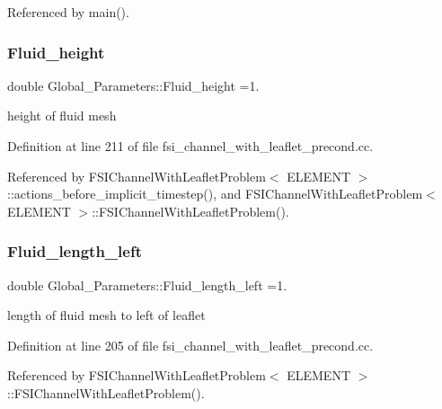 Referenced by main().

\mbox{\label{namespaceGlobal__Parameters_ae1aaf6e9438d5ff7715fe6ceaeaf4fbc}} 
\subsubsection{\texorpdfstring{Fluid\+\_\+height}{Fluid\_height}}
{\footnotesize\ttfamily double Global\+\_\+\+Parameters\+::\+Fluid\+\_\+height =1.}



height of fluid mesh 



Definition at line 211 of file fsi\+\_\+channel\+\_\+with\+\_\+leaflet\+\_\+precond.\+cc.



Referenced by F\+S\+I\+Channel\+With\+Leaflet\+Problem$<$ E\+L\+E\+M\+E\+N\+T $>$\+::actions\+\_\+before\+\_\+implicit\+\_\+timestep(), and F\+S\+I\+Channel\+With\+Leaflet\+Problem$<$ E\+L\+E\+M\+E\+N\+T $>$\+::\+F\+S\+I\+Channel\+With\+Leaflet\+Problem().

\mbox{\label{namespaceGlobal__Parameters_aced7b712f2e8390ceef273157690001b}} 
\subsubsection{\texorpdfstring{Fluid\+\_\+length\+\_\+left}{Fluid\_length\_left}}
{\footnotesize\ttfamily double Global\+\_\+\+Parameters\+::\+Fluid\+\_\+length\+\_\+left =1.}



length of fluid mesh to left of leaflet 



Definition at line 205 of file fsi\+\_\+channel\+\_\+with\+\_\+leaflet\+\_\+precond.\+cc.



Referenced by F\+S\+I\+Channel\+With\+Leaflet\+Problem$<$ E\+L\+E\+M\+E\+N\+T $>$\+::\+F\+S\+I\+Channel\+With\+Leaflet\+Problem().

